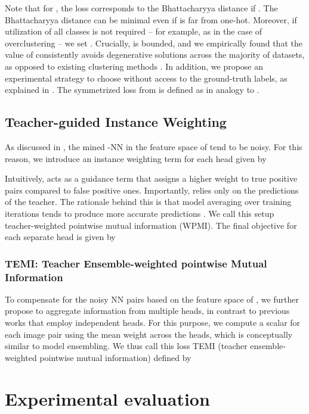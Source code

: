 \documentclass{bmvc2k}
\begin{document}
Note that for , the loss corresponds to the Bhattacharyya distance \cite{bhattacharyya1946measure} if . The Bhattacharyya distance can be minimal even if  is far from one-hot. Moreover, if utilization of all classes is not required -- for example, as in the case of overclustering -- we set . Crucially,  is bounded, and we empirically found that the value of  consistently avoids degenerative solutions across the majority of datasets, as opposed to existing clustering methods \cite{scan,sscn}. In addition, we propose an experimental strategy to choose  without access to the ground-truth labels, as explained in . The symmetrized loss from  is defined as  in analogy to .  


\subsection{Teacher-guided Instance Weighting}
\label{subsec:weight}
As discussed in , the mined -NN in the feature space of  tend to be noisy. For this reason, we introduce an instance weighting term for each head  given by

Intuitively,  acts as a guidance term that assigns a higher weight to true positive pairs compared to false positive ones. Importantly,  relies only on the predictions of the teacher. The rationale behind this is that model averaging over training iterations tends to produce more accurate predictions \cite{tarvainen2017mean,polyak1992acceleration}. We call this setup teacher-weighted pointwise mutual information (WPMI). The final objective for each separate head  is given by  


\subsubsection{TEMI: Teacher Ensemble-weighted pointwise Mutual Information}
To compensate for the noisy NN pairs based on the feature space of , we further propose to aggregate information from multiple heads, in contrast to previous works \cite{scan} that employ independent heads. For this purpose, we compute a scalar for each image pair using the mean weight across the heads, which is conceptually similar to model ensembling. We thus call this loss TEMI (teacher ensemble-weighted pointwise mutual information) defined by


\section{Experimental evaluation}
\label{experimental}
\end{document}
